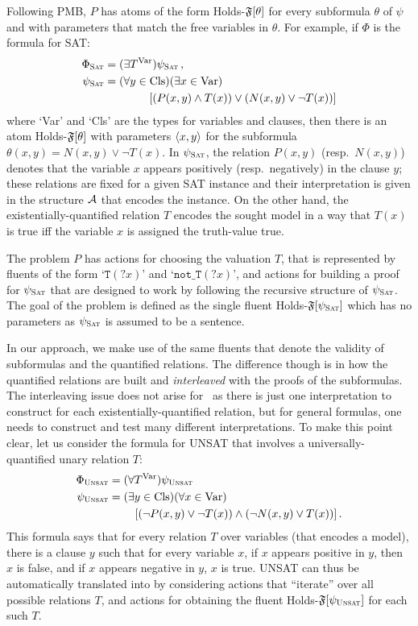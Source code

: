 Following PMB, $P$ has atoms of the form Holds-$\mathfrak{F}[\theta]$
for every subformula $\theta$ of $\psi$ and with parameters
that match the free variables in $\theta$. For example,
if $\Phi$ is the formula for SAT:
\begin{alignat*}{1}
\Phi_{\textsc{Sat}} &= (\exists T^\text{Var})\psi_{\textsc{Sat}} \,, \\
\psi_{\textsc{Sat}} &= (\forall y\in \text{Cls})(\exists x\in\text{Var}) \notag \\
          &\quad\quad\quad\quad
               [(P(x,y) \land T(x)) \lor (N(x,y) \lor \neg T(x))]
\end{alignat*}
where `Var' and `Cls' are the types for variables and clauses,
then there is an atom Holds-$\mathfrak{F}[\theta]$ with parameters
$\langle x,y \rangle$ for the subformula $\theta(x,y)=N(x,y)\lor\neg T(x)$.
In $\psi_{\textsc{Sat}}$, the relation $P(x,y)$ (resp.\ $N(x,y)$) denotes
that the variable $x$ appears positively (resp.\ negatively) in
the clause $y$; these relations are fixed for a given SAT instance
and their interpretation is given in the structure $\mathcal{A}$ that
encodes the instance.
On the other hand, the existentially-quantified relation $T$
encodes the sought model in a way that $T(x)$ is true iff the
variable $x$ is assigned the truth-value true.

The problem $P$ has actions for choosing the valuation $T$,
that is represented by fluents of the form `$\texttt{T}(?x)$'
and `$\texttt{not\_T}(?x)$', and actions for building a
proof for $\psi_{\textsc{Sat}}$ that are designed to work by following
the recursive structure of $\psi_{\textsc{Sat}}$.
The goal of the problem is defined as the single fluent
Holds-$\mathfrak{F}[\psi_{\textsc{Sat}}]$ which has no parameters as $\psi_{\textsc{Sat}}$
is assumed to be a sentence.

\smallskip

In our approach, we make use of the same fluents that denote
the validity of subformulas and the quantified relations.
The difference though is in how the quantified relations
are built and \emph{interleaved} with the proofs of the
subformulas. 
The interleaving issue does not arise for \SOE\ as there is
just one interpretation to construct for each existentially-quantified
relation, but for general formulas, one needs to construct
and test many different interpretations.
To make this point clear, let us consider the formula
for UNSAT that involves a universally-quantified unary relation $T$:
\begin{alignat*}{1}
\Phi_{\textsc{Unsat}} &= (\forall T^\text{Var})\psi_{\textsc{Unsat}} \\
\psi_{\textsc{Unsat}} &= (\exists y\in\text{Cls})(\forall x\in\text{Var}) \\
            &\quad\quad\ [(\neg P(x,y) \lor \neg T(x))\land(\neg N(x,y)\lor T(x))] \,.
\end{alignat*}
This formula
says that for every relation $T$ over variables (that encodes
a model), there is a clause $y$ such that for every variable $x$,
if $x$ appears positive in $y$, then $x$ is false, and if $x$
appears negative in $y$, $x$ is true.
UNSAT can thus be automatically translated into \STRIPS by 
considering actions that ``iterate'' over all possible relations
$T$, and actions for obtaining the fluent
Holds-$\mathfrak{F}[\psi_{\textsc{Unsat}}]$ for each such $T$.

